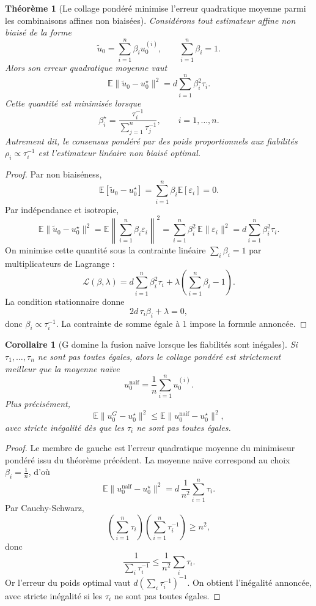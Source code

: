\documentclass[11pt,a4paper]{article}
\newtheorem{theorem}{Théorème}[section]
\newtheorem{corollary}{Corollaire}[section]
\newcommand{\1}{\mathbf 1}
\begin{document}
\begin{theorem}[Le collage pondéré minimise l'erreur quadratique moyenne parmi les combinaisons affines non biaisées]
Considérons tout estimateur affine non biaisé de la forme
\[
\tilde u_0=\sum_{i=1}^n \beta_i u_0^{(i)},
\qquad
\sum_{i=1}^n \beta_i=1.
\]
Alors son erreur quadratique moyenne vaut
\[
\mathbb E\|\tilde u_0-u_0^\star\|^2
=
d\sum_{i=1}^n \beta_i^2 \tau_i.
\]
Cette quantité est minimisée lorsque
\[
\beta_i^\star
=
\frac{\tau_i^{-1}}{\sum_{j=1}^n \tau_j^{-1}},
\qquad i=1,\dots,n.
\]
Autrement dit, le consensus pondéré par des poids proportionnels aux fiabilités
\(\rho_i\propto \tau_i^{-1}\) est l'estimateur linéaire non biaisé optimal.
\end{theorem}

\begin{proof}
Par non biaiséness,
\[
\mathbb E[\tilde u_0-u_0^\star]
=
\sum_{i=1}^n \beta_i \mathbb E[\varepsilon_i]
=
0.
\]
Par indépendance et isotropie,
\[
\mathbb E\|\tilde u_0-u_0^\star\|^2
=
\mathbb E\left\|\sum_{i=1}^n \beta_i\varepsilon_i\right\|^2
=
\sum_{i=1}^n \beta_i^2\,\mathbb E\|\varepsilon_i\|^2
=
d\sum_{i=1}^n \beta_i^2\tau_i.
\]
On minimise cette quantité sous la contrainte linéaire \(\sum_i \beta_i=1\) par multiplicateurs de Lagrange :
\[
\mathcal L(\beta,\lambda)
=
d\sum_{i=1}^n \beta_i^2\tau_i
+
\lambda\left(\sum_{i=1}^n \beta_i-1\right).
\]
La condition stationnaire donne
\[
2d\,\tau_i\beta_i+\lambda=0,
\]
donc \(\beta_i\propto \tau_i^{-1}\). La contrainte de somme égale à \(1\) impose la formule annoncée.
\end{proof}

\begin{corollary}[G domine la fusion naïve lorsque les fiabilités sont inégales]
Si \(\tau_1,\dots,\tau_n\) ne sont pas toutes égales, alors le collage pondéré est strictement meilleur que la moyenne naïve
\[
u_0^{\mathrm{naif}}=\frac1n\sum_{i=1}^n u_0^{(i)}.
\]
Plus précisément,
\[
\mathbb E\|u_0^{G}-u_0^\star\|^2
\le
\mathbb E\|u_0^{\mathrm{naif}}-u_0^\star\|^2,
\]
avec stricte inégalité dès que les \(\tau_i\) ne sont pas toutes égales.
\end{corollary}

\begin{proof}
Le membre de gauche est l'erreur quadratique moyenne du minimiseur pondéré issu du théorème précédent.
La moyenne naïve correspond au choix \(\beta_i=\frac1n\), d'où
\[
\mathbb E\|u_0^{\mathrm{naif}}-u_0^\star\|^2
=
d\,\frac{1}{n^2}\sum_{i=1}^n \tau_i.
\]
Par Cauchy-Schwarz,
\[
\left(\sum_{i=1}^n \tau_i\right)\left(\sum_{i=1}^n \tau_i^{-1}\right)\ge n^2,
\]
donc
\[
\frac{1}{\sum_i \tau_i^{-1}}
\le
\frac1{n^2}\sum_i \tau_i.
\]
Or l'erreur du poids optimal vaut \(d(\sum_i\tau_i^{-1})^{-1}\). On obtient l'inégalité annoncée, avec stricte inégalité si les \(\tau_i\) ne sont pas toutes égales.
\end{proof}
\end{document}
